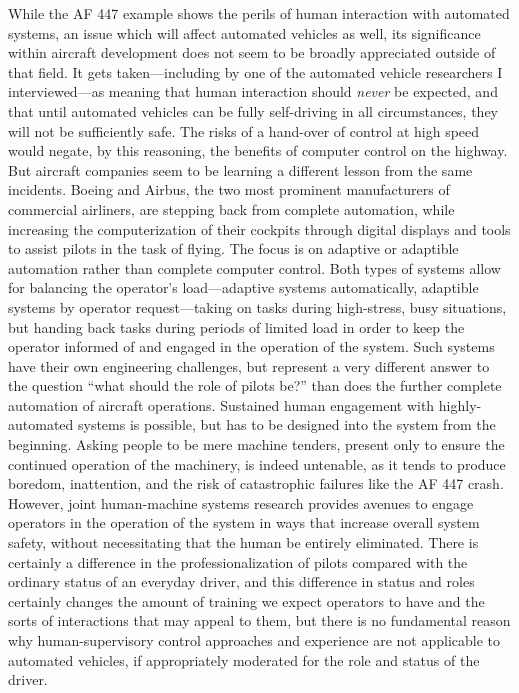 While the AF 447 example shows the
perils of human interaction with automated systems, an issue which will
affect automated vehicles as well, its significance
within aircraft development does not seem to be broadly appreciated
outside of that field. It gets taken---including by one of the
automated vehicle researchers I interviewed---as meaning that human
interaction should \emph{never} be expected, and that until automated
vehicles can be fully self-driving in all circumstances, they will not
be sufficiently safe. The risks of a hand-over of control at high
speed would negate, by this reasoning, the benefits of computer
control on the highway. But aircraft companies seem to be learning a
different lesson from the same incidents. Boeing and Airbus, the two
most prominent manufacturers of commercial airliners, are stepping
back from complete automation, while increasing the computerization of
their cockpits through digital displays and tools to assist pilots in
the task of flying\cite{???}. The focus is on adaptive or adaptible automation
rather than complete computer control. Both types of systems allow for
balancing the operator's load---adaptive systems automatically,
adaptible systems by operator request---taking on tasks during
high-stress, busy situations, but handing back tasks during periods of
limited load in order to keep the operator informed of and engaged in
the operation of the system\cite{???}. Such systems have their own
engineering challenges, but represent a very different answer to the
question ``what should the role of pilots be?'' than does the further
complete automation of aircraft operations. Sustained human engagement
with highly-automated systems is possible, but has to be designed into
the system from the beginning. Asking people to be mere machine
tenders, present only to ensure the continued operation of the
machinery, is indeed untenable, as it tends to produce boredom,
inattention, and the risk of catastrophic failures like the AF 447
crash. However, joint human-machine systems research provides avenues
to engage operators in the operation of the system in ways that
increase overall system safety, without necessitating that the human
be entirely eliminated. There is certainly a difference in the
professionalization of pilots compared with the ordinary status of an
everyday driver, and this difference in status and roles certainly
changes the amount of training we expect operators to have and the
sorts of interactions that may appeal to them, but there is no
fundamental reason why human-supervisory control approaches and
experience are not applicable to automated vehicles, if appropriately
moderated for the role and status of the driver. 

